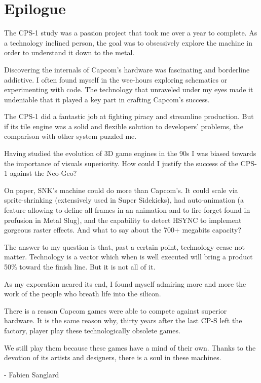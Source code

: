 \chapter{Epilogue} 

The CPS-1 study was a passion project that took me over a year to complete. As a technology inclined person, the goal was to obsessively explore the machine in order to understand it down to the metal.

Discovering the internals of Capcom's hardware was fascinating and borderline addictive. I often found myself in the wee-hours exploring schematics or experimenting with code. The technology that unraveled under my eyes made it undeniable that it played a key part in crafting Capcom's success. 

The CPS-1 did a fantastic job at fighting piracy and streamline production. But if its tile engine was a solid and flexible solution to developers' problems, the comparison with other system puzzled me.

Having studied the evolution of 3D game engines in the 90s I was biased towards the importance of visuals superiority. How could I justify the success of the CPS-1 against the Neo-Geo? 

On paper, SNK's machine could do more than Capcom's. It could scale via sprite-shrinking (extensively used in Super Sidekicks),
had auto-animation (a feature allowing to define all frames in an animation and to fire-forget found in profusion in Metal Slug), and the capability to detect HSYNC to implement gorgeous raster effects. And what to say about the 700+ megabits capacity?

The answer to my question is that, past a certain point, technology cease not matter. Technology is a vector which when is well executed will bring a product 50\% toward the finish line. But it is not all of it.

As my exporation neared its end, I found myself admiring more and more the work of the people who breath life into the silicon.   

There is a reason Capcom games were able to compete against superior hardware. It is the same reason why, thirty years after the last CP-S left the factory, player play these technologically obsolete games.

We still play them because these games have a mind of their own. Thanks to the devotion of its artists and designers, there is a soul in these machines.

- Fabien Sanglard
